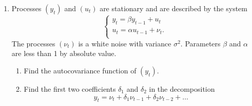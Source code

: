 \documentclass[12pt]{article}
\begin{document}
\begin{enumerate}
    \item Processes $(y_t)$ and $(u_t)$ are stationary and are described by the system 
    \[
    \begin{cases}
      y_t = \beta y_{t-1} + u_t \\
      u_t = \alpha u_{t-1} + \nu_t. \\
    \end{cases}  
    \]
    The processes $(\nu_t)$ is a white noise with variance $\sigma^2$. 
    Parameters $\beta$ and $\alpha$ are less than 1 by absolute value.

    \begin{enumerate}
        \item Find the autocovariance function of $(y_t)$.
        \item Find the first two coefficients $\delta_1$ and $\delta_2$ in the decomposition 
        \[
        y_t = \nu_t + \delta_1 \nu_{t-1} + \delta_2 \nu_{t-2} + \ldots    
        \]
        
    \end{enumerate}
      
 
\end{enumerate}
\end{document}
